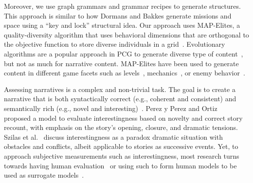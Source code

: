 
Moreover, we use graph grammars and grammar recipes to generate structures. This approach is similar to how Dormans and Bakkes \cite{p12dormans2011generating} generate missions and space using a ``key and lock'' structural idea. Our approach uses MAP-Elites, a quality-diversity algorithm that uses behavioral dimensions that are orthogonal to the objective function to store diverse individuals in a grid~\cite{p12Mouret2015-MAPElites}. Evolutionary algorithms are a popular approach in PCG to generate diverse type of content~\cite{p12Togelius2011}, but not as much for narrative content. MAP-Elites have been used to generate content in different game facets such as levels~\cite{p12charity2020baba,Alvarez2020-ICMAPE}, mechanics~\cite{p12charity2020mech}, or enemy behavior~\cite{p12Khalifa2018}.



Assessing narratives is a complex and non-trivial task. The goal is to create a narrative that is both syntactically correct (e.g., coherent and consistent) and semantically rich (e.g., novel and interesting)~\cite{p12Rowe2009-STORYEVAL,Hargood2011-NarrativeCohesion,Castricato2021-FabulaStoryCoherenceMeasure}. Perez y Perez and Ortiz~\cite{p12Perez2013-AutomaticModelInterestingness} proposed a model to evaluate interestingness based on novelty and correct story recount, with emphasis on the story's opening, closure, and dramatic tensions. Szilas et al.~\cite{p12Szilas2016-QualQuantInterestingness} discuss interestingness as a paradox dramatic situation with obstacles and conflicts, albeit applicable to stories as successive events. Yet, to approach subjective measurements such as interestingness, most research turns towards having human evaluation~\cite{p12Kreminski2019-StorySifter,Lankoski2013-StoryConsistencyInteresting} or using such to form human models to be used as surrogate models~\cite{p12Sharna2007-PreferenceModelingStories,Li2010-plannerPlotAdapt}.



%
